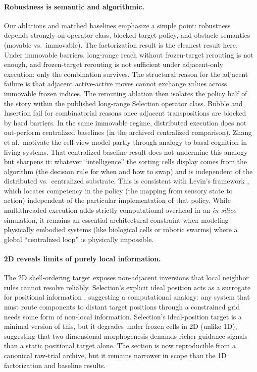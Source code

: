 \documentclass[11pt]{article}
\begin{document}
\paragraph{Robustness is semantic and algorithmic.}
Our ablations and matched baselines emphasize a simple point: robustness depends strongly on
operator class, blocked-target policy, and obstacle semantics (movable vs.\ immovable).
The factorization result is the cleanest result here. Under immovable barriers, long-range reach
without frozen-target rerouting is not enough, and frozen-target rerouting is not sufficient under
adjacent-only execution; only the combination survives. The structural reason for the adjacent
failure is that adjacent active-active moves cannot exchange values across immovable frozen
indices. The rerouting ablation then isolates the policy half of the story within the published
long-range Selection operator class.
Bubble and Insertion fail for combinatorial reasons once adjacent transpositions are blocked by
hard barriers.
In the same immovable regime, distributed execution does not out-perform centralized baselines
(in the archived centralized comparison).
Zhang et al.\ motivate the cell-view model partly through analogy to basal cognition in living
systems. That centralized-baseline result does not undermine this analogy but sharpens it: whatever
``intelligence'' the sorting cells display comes from the algorithm (the decision rule for when and
how to swap) and is independent of the distributed vs.\ centralized substrate. This is consistent
with Levin's framework \cite{levin2022technological}, which locates competency in the policy (the
mapping from sensory state to action) independent of the particular implementation of that policy.
While multithreaded execution adds strictly computational overhead in an \emph{in-silico} simulation, it remains an essential architectural constraint when modeling physically embodied systems (like biological cells or robotic swarms) where a global ``centralized loop'' is physically impossible.

\paragraph{2D reveals limits of purely local information.}
The 2D shell-ordering target exposes non-adjacent inversions that local neighbor rules cannot resolve
reliably. Selection's explicit ideal position acts as a surrogate for positional information
\cite{wolpert1969positional}, suggesting a computational analogy: any system that must route
components to distant target positions through a constrained grid needs some form of non-local
information. Selection's ideal-position target is a minimal version of this, but it degrades under
frozen cells in 2D (unlike 1D), suggesting that two-dimensional morphogenesis demands richer
guidance signals than a static positional target alone. The section is now reproducible from a
canonical raw-trial archive, but it remains narrower in scope than the 1D factorization and
baseline results.
\end{document}
